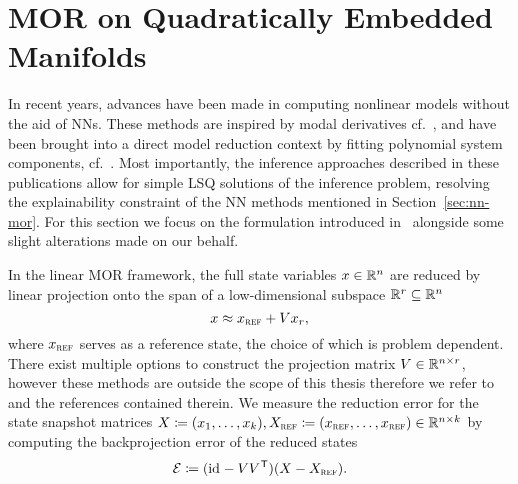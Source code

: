 \section{MOR on Quadratically Embedded Manifolds}\label{sec:mor-quadratically-embedded-manifolds}

In recent years, advances have been made in computing nonlinear models without the aid of \acp{NN}.
These methods are inspired by modal derivatives cf.~\cite{Wu2016, Weeger2016, Jain2017, Rutzmoser2017}, and have been brought into a direct model reduction context by fitting polynomial system components, cf.~\cite{Peherstorfer2016, BGK2020, BGH2020, Gosea2021, Barnett2022, Khodabakhshi2022, Qian2022, Geelen2023}.
Most importantly, the inference approaches described in these publications allow for simple \ac{LSQ} solutions of the inference problem, resolving the explainability constraint of the \ac{NN} methods mentioned in Section~\ref{sec:nn-mor}.
For this section we focus on the formulation introduced in~\cite{Geelen2023} alongside some slight alterations made on our behalf.

In the linear MOR framework, the full state variables $x \in \mathbb{R}^n$ are reduced by linear projection onto the span of a low-dimensional subspace $\mathbb{R}^r \subseteq \mathbb{R}^n$
\begin{equation}\label{eq:linear-state-reduction}
    x \approx x_{\textnormal{\scshape ref}} + V x_r,
\end{equation}
where $x_{\textnormal{\scshape ref}}$ serves as a reference state, the choice of which is problem dependent.
There exist multiple options to construct the projection matrix $V \in \mathbb{R}^{n \times r}$, however these methods are outside the scope of this thesis therefore we refer to~\cite{BOP2017, BCO2017} and the references contained therein.
We measure the reduction error for the state snapshot matrices $X \coloneqq (x_1, \dots, x_k), X_{\textnormal{\scshape ref}} \coloneqq (x_{\textnormal{\scshape ref}}, \dots, x_{\textnormal{\scshape ref}}) \in \mathbb{R}^{n \times k}$ by computing the backprojection error of the reduced states
\begin{equation}
    \mathcal{E} \coloneqq (\text{id}_{} - V V^{\mkern1mu \mathsf{T}}) (X - X_{\textnormal{\scshape ref}}).
\end{equation}


